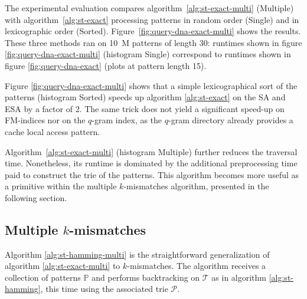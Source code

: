 The experimental evaluation compares algorithm~\ref{alg:st-exact-multi} (Multiple) with algorithm~\ref{alg:st-exact} processing patterns in random order (Single) and in lexicographic order (Sorted).
Figure~\ref{fig:query-dna-exact-multi} shows the results.
These three methods ran on 10~M patterns of length 30: runtimes shown in figure \ref{fig:query-dna-exact-multi} (histogram Single) correspond to runtimes shown in figure \ref{fig:query-dna-exact} (plots at pattern length 15).

Figure \ref{fig:query-dna-exact-multi} shows that a simple lexicographical sort of the patterns (histogram Sorted) speeds up algorithm \ref{alg:st-exact} on the SA and ESA by a factor of 2.
The same trick does not yield a significant speed-up on FM-indices nor on the $q$-gram index, as the $q$-gram directory already provides a cache local access pattern.

Algorithm~\ref{alg:st-exact-multi} (histogram Multiple) further reduces the traversal time.
Nonetheless, its runtime is dominated by the additional preprocessing time paid to construct the trie of the patterns.
This algorithm becomes more useful as a primitive within the multiple $k$-mismatches algorithm, presented in the following section.

\subsection{Multiple $k$-mismatches}
\label{sec:index:algo:multimismatch}

Algorithm \ref{alg:st-hamming-multi} is the straightforward generalization of algorithm \ref{alg:st-exact-multi} to $k$-mismatches.
The algorithm receives a collection of patterns $\mathbb{P}$ and performs backtracking on $\mathcal{T}$ as in algorithm  \ref{alg:st-hamming}, this time using the associated trie $\mathcal{P}$.

